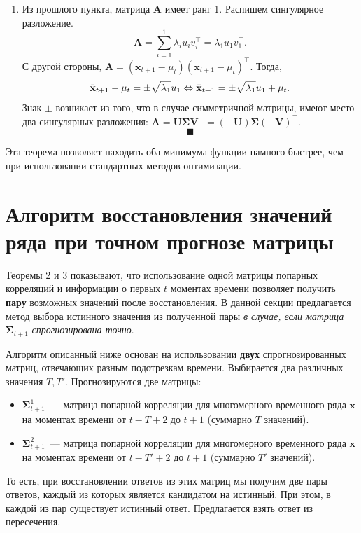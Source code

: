 \documentclass{article}
\begin{document}
\begin{enumerate}
 	\item Из прошлого пункта, матрица $\mathbf{A}$ имеет ранг 1. Распишем сингулярное разложение. \[
 		\mathbf{A} = \sum_{i=1}^{1} \lambda_i u_i v_i^\intercal = \lambda_1 u_1 v_1^\intercal.
 	\]
 	С другой стороны, $\mathbf{A} = (\bar{\mathbf{x}}_{t+1}-\mu_t)(\bar{\mathbf{x}}_{t+1}-\mu_t)^\intercal$. Тогда, \[
 	\bar{\mathbf{x}}_{t+1}-\mu_t = \pm\sqrt{\lambda_1} u_1 \Leftrightarrow\\
 	\bar{\mathbf{x}}_{t+1} = \pm\sqrt{\lambda_1} u_1 + \mu_t.
 	\]
 	Знак $\pm$ возникает из того, что в случае симметричной матрицы, имеют место два сингулярных разложения: $\mathbf{A}=\mathbf{U}\mathbf{\Sigma} \mathbf{V}^\intercal=(-\mathbf{U})\mathbf{\Sigma} (-\mathbf{V})^\intercal$.
 	$$ \blacksquare $$
\end{enumerate}

Эта теорема позволяет находить оба минимума функции намного быстрее, чем при использовании стандартных методов оптимизации.

\section{Алгоритм восстановления значений ряда при точном прогнозе матрицы}

Теоремы 2 и 3 показывают, что использование одной матрицы попарных корреляций и информации о первых $t$ моментах времени позволяет получить \textbf{пару} возможных значений после восстановления. В данной секции предлагается метод выбора истинного значения из полученной пары \textit{в случае, если матрица}  $\mathbf{\Sigma}_{t+1}$  \textit{спрогнозирована точно}.

Алгоритм описанный ниже основан на использовании \textbf{двух} спрогнозированных матриц, отвечающих разным подотрезкам времени. Выбирается два различных значения $T, T'$. Прогнозируются две матрицы:
\begin{itemize}
	\item $\mathbf{\Sigma}_{t+1}^1$~--- матрица попарной корреляции для многомерного временного ряда $\mathbf{x}$ на моментах времени от $t-T+2$ до $t+1$ (суммарно $T$ значений).
	\item $\mathbf{\Sigma}_{t+1}^2$~--- матрица попарной корреляции для многомерного временного ряда $\mathbf{x}$ на моментах времени от $t-T'+2$ до $t+1$ (суммарно $T'$ значений).
\end{itemize}

То есть, при восстановлении ответов из этих матриц мы получим две пары ответов, каждый из которых является кандидатом на истинный. При этом, в каждой из пар существует истинный ответ. Предлагается взять ответ из пересечения.
\end{document}
